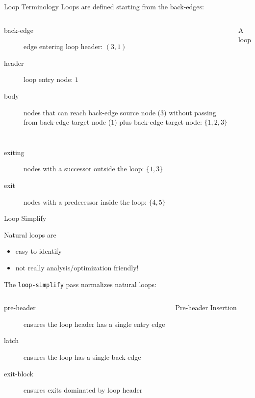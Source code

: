 \begin{frame}{Loop Terminology}
Loops are defined starting from the back-edges:

\begin{columns}[t]

\begin{description}
\item[back-edge] edge entering loop header: $(3,1)$
\item[header] loop entry node: $1$
\item[body] nodes that can reach back-edge source node ($3$) without passing
            from back-edge target node ($1$) plus back-edge target node:
            $\{1 ,2, 3\}$
\end{description}

\begin{block}{\small A loop}

\end{block}

\end{columns}

\begin{description}
\item[exiting] nodes with a successor outside the loop: $\{1, 3\}$
\item[exit] nodes with a predecessor inside the loop: $\{4, 5\}$
\end{description}
\end{frame}


\begin{frame}{Loop Simplify}

Natural loops are

\begin{itemize}
\item easy to \alert{identify}
\item not really analysis/optimization friendly!
\end{itemize}

\vfill
The \texttt{loop-simplify} pass normalizes natural loops:

\begin{columns}[t]
\begin{description}
\item[pre-header] ensures the \alert{loop header} has \alert{a single entry edge}
\item[latch] ensures the loop has \alert{a single back-edge}
\item[exit-block] ensures \alert{exits dominated} by loop \alert{header}
\end{description}

\vspace{-1em}
\begin{block}{Pre-header Insertion}
\centering

\end{block}
\end{columns}
\end{frame}


